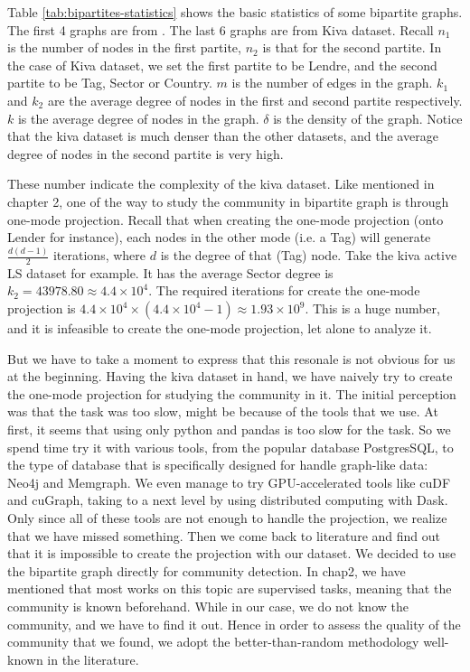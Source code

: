 Table \ref{tab:bipartites-statistics} shows the basic statistics of some bipartite graphs.
The first 4 graphs are from \cite{latapy2006}.
The last 6 graphs are from Kiva dataset.
Recall $n_1$ is the number of nodes in the first partite, $n_2$ is that for the second partite.
In the case of Kiva dataset, we set the first partite to be Lendre, and the second partite to be Tag, Sector or Country.
$m$ is the number of edges in the graph.
$k_1$ and $k_2$ are the average degree of nodes in the first and second partite respectively.
$k$ is the average degree of nodes in the graph.
$\delta$ is the density of the graph.
Notice that the kiva dataset is much denser than the other datasets,
and the average degree of nodes in the second partite is very high.

These number indicate the complexity of the kiva dataset.
Like mentioned in chapter 2, one of the way to study the community in bipartite graph is through one-mode projection.
Recall that when creating the one-mode projection (onto Lender for instance),
each nodes in the other mode (i.e. a Tag) will generate $\frac{d(d-1)}{2}$ iterations,
where $d$ is the degree of that (Tag) node.
Take the kiva active LS dataset for example.
It has the average Sector degree is $k_2=43978.80 \approx 4.4\times 10^4$.
The required iterations for create the one-mode projection is
$4.4\times 10^4 \times (4.4\times 10^4 - 1) \approx 1.93 \times 10^9$.
This is a huge number, and it is infeasible to create the one-mode projection, let alone to analyze it.

But we have to take a moment to express that this resonale is not obvious for us at the beginning.
Having the kiva dataset in hand, we have naively try to create the one-mode projection for studying the community in it.
The initial perception was that the task was too slow, might be because of the tools that we use.
At first, it seems that using only python and pandas is too slow for the task.
So we spend time try it with various tools, from the popular database PostgresSQL,
to the type of database that is specifically designed for handle graph-like data: Neo4j and Memgraph.
We even manage to try GPU-accelerated tools like cuDF and cuGraph,
taking to a next level by using distributed computing with Dask.
Only since all of these tools are not enough to handle the projection,
we realize that we have missed something.
Then we come back to literature and find out that it is impossible to create the projection with our dataset.
We decided to use the bipartite graph directly for community detection.
In chap2, we have mentioned that most works on this topic are supervised tasks,
meaning that the community is known beforehand.
While in our case, we do not know the community, and we have to find it out.
Hence in order to assess the quality of the community that we found,
we adopt the better-than-random methodology well-known in the literature.


